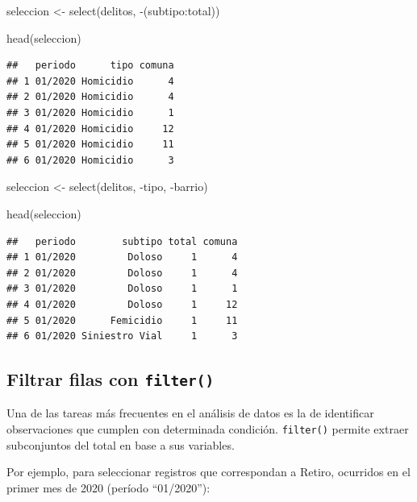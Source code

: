 \documentclass[
]{book}
\newenvironment{Shaded}{\begin{snugshade}}{\end{snugshade}}
\newcommand{\FunctionTok}[1]{\textcolor[rgb]{0.00,0.00,0.00}{#1}}
\newcommand{\NormalTok}[1]{#1}
\newcommand{\OtherTok}[1]{\textcolor[rgb]{0.56,0.35,0.01}{#1}}
\newcommand{\SpecialCharTok}[1]{\textcolor[rgb]{0.00,0.00,0.00}{#1}}
\begin{document}
\begin{Shaded}
\begin{Highlighting}[]
\NormalTok{seleccion }\OtherTok{\textless{}{-}} \FunctionTok{select}\NormalTok{(delitos, }\SpecialCharTok{{-}}\NormalTok{(subtipo}\SpecialCharTok{:}\NormalTok{total))}

\FunctionTok{head}\NormalTok{(seleccion)}
\end{Highlighting}
\end{Shaded}

\begin{verbatim}
##   periodo      tipo comuna
## 1 01/2020 Homicidio      4
## 2 01/2020 Homicidio      4
## 3 01/2020 Homicidio      1
## 4 01/2020 Homicidio     12
## 5 01/2020 Homicidio     11
## 6 01/2020 Homicidio      3
\end{verbatim}

\begin{Shaded}
\begin{Highlighting}[]
\NormalTok{seleccion }\OtherTok{\textless{}{-}} \FunctionTok{select}\NormalTok{(delitos, }\SpecialCharTok{{-}}\NormalTok{tipo, }\SpecialCharTok{{-}}\NormalTok{barrio)}

\FunctionTok{head}\NormalTok{(seleccion)}
\end{Highlighting}
\end{Shaded}

\begin{verbatim}
##   periodo        subtipo total comuna
## 1 01/2020         Doloso     1      4
## 2 01/2020         Doloso     1      4
## 3 01/2020         Doloso     1      1
## 4 01/2020         Doloso     1     12
## 5 01/2020      Femicidio     1     11
## 6 01/2020 Siniestro Vial     1      3
\end{verbatim}

\hypertarget{filtrar-filas-con-filter}{%
\subsection{\texorpdfstring{Filtrar filas con \texttt{filter()}}{Filtrar filas con filter()}}\label{filtrar-filas-con-filter}}

Una de las tareas más frecuentes en el análisis de datos es la de identificar observaciones que cumplen con determinada condición. \texttt{filter()} permite extraer subconjuntos del total en base a sus variables.

Por ejemplo, para seleccionar registros que correspondan a Retiro, ocurridos en el primer mes de 2020 (período ``01/2020''):
\end{document}
